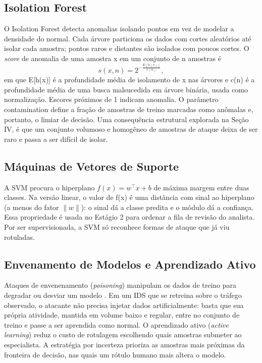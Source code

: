 \documentclass[a4paper,10pt, twocolumn]{article}
\begin{document}
\subsection{Isolation Forest}
O Isolation Forest \cite{Tony2008Isolation} detecta anomalias isolando pontos em vez de modelar a densidade do normal. 
Cada árvore particiona os dados com cortes aleatórios até isolar cada amostra; pontos raros e distantes 
são isolados com poucos cortes. O \textit{score} de anomalia de uma amostra x em um conjunto de n amostras é 
\begin{equation}
s(x, n) = 2^{-\frac{E[h(x)]}{c(n)}},
\end{equation}
em que E[h(x)] é a profundidade média de isolamento de x nas árvores e c(n) é a profundidade média 
de uma busca malsucedida em árvore binária, usada como normalização. Escores próximos de 1 indicam 
anomalia. O parâmetro contamination define a fração de amostras de treino marcadas como anômalas e, 
portanto, o limiar de decisão. Uma consequência estrutural explorada na Seção IV, é que um conjunto 
volumoso e homogêneo de amostras de ataque deixa de ser raro e passa a ser difícil de isolar.

\subsection{Máquinas de Vetores de Suporte}
A SVM \cite{Corinna1995Support} procura o hiperplano $f(x) = w^\top x + b$ de máxima margem entre duas classes. Na versão 
linear, o valor de f(x) é uma distância com sinal ao hiperplano (a menos do fator $\|w\|$): o sinal dá 
a classe predita e o módulo dá a confiança. Essa propriedade é usada no Estágio 2 para ordenar a 
fila de revisão do analista. Por ser supervisionada, a SVM só reconhece formas de ataque que já viu 
rotuladas.

\subsection{Envenamento de Modelos e Aprendizado Ativo}
Ataques de envenenamento (\textit{poisoning}) manipulam os dados de treino para degradar ou desviar um modelo \cite{Battista2012Poisoning}. 
Em um IDS que se retreina sobre o tráfego observado, o atacante não precisa injetar dados artificialmente: 
basta que sua própria atividade, mantida em volume baixo e regular, entre no conjunto de treino e passe a 
ser aprendida como normal. 
O aprendizado ativo (\textit{active learning}) \cite{Settles2009Active} reduz o custo de rotulagem escolhendo 
quais amostras submeter ao especialista. A estratégia por incerteza prioriza as amostras mais próximas da 
fronteira de decisão, nas quais um rótulo humano mais altera o modelo. 
\end{document}
